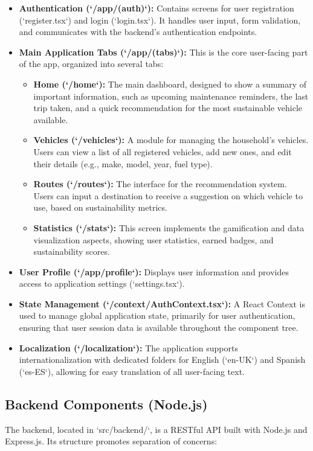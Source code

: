 \begin{itemize}
    \item \textbf{Authentication (`/app/(auth)`):} Contains screens for user registration (`register.tsx`) and login (`login.tsx`). It handles user input, form validation, and communicates with the backend's authentication endpoints.
    \item \textbf{Main Application Tabs (`/app/(tabs)`):} This is the core user-facing part of the app, organized into several tabs:
    \begin{itemize}
        \item \textbf{Home (`/home`):} The main dashboard, designed to show a summary of important information, such as upcoming maintenance reminders, the last trip taken, and a quick recommendation for the most sustainable vehicle available.
        \item \textbf{Vehicles (`/vehicles`):} A module for managing the household's vehicles. Users can view a list of all registered vehicles, add new ones, and edit their details (e.g., make, model, year, fuel type).
        \item \textbf{Routes (`/routes`):} The interface for the recommendation system. Users can input a destination to receive a suggestion on which vehicle to use, based on sustainability metrics.
        \item \textbf{Statistics (`/stats`):} This screen implements the gamification and data visualization aspects, showing user statistics, earned badges, and sustainability scores.
    \end{itemize}
    \item \textbf{User Profile (`/app/profile`):} Displays user information and provides access to application settings (`settings.tsx`).
    \item \textbf{State Management (`/context/AuthContext.tsx`):} A React Context is used to manage global application state, primarily for user authentication, ensuring that user session data is available throughout the component tree.
    \item \textbf{Localization (`/localization`):} The application supports internationalization with dedicated folders for English (`en-UK`) and Spanish (`es-ES`), allowing for easy translation of all user-facing text.
\end{itemize}

\subsection{Backend Components (Node.js)}
The backend, located in `src/backend/`, is a RESTful API built with Node.js and Express.js. Its structure promotes separation of concerns:

